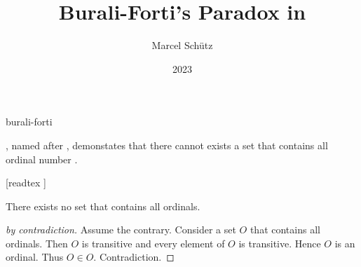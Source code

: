 \documentclass{stex}
\begin{document}
\title{Burali-Forti's Paradox in \Naproche}
\author{Marcel Schütz}
\date{2023}
\maketitle
\begin{smodule}{burali-forti}
\begin{sparagraph}
  \emph{}, named after , demonstates that there cannot exists a set that contains all ordinal number \cite{BuraliForti1897}.
\end{sparagraph}

\begin{forthel}
  [readtex ]

  \begin{theorem*}\label{burali_forti_paradox}
    There exists no set that contains all ordinals.
  \end{theorem*}
  \begin{proof}[ by contradiction]
    Assume the contrary.
    Consider a set $O$ that contains all ordinals.
    Then $O$ is transitive and every element of $O$ is transitive.
    Hence $O$ is an ordinal.
    Thus $O \in O$.
    Contradiction.
  \end{proof}
\end{forthel}
\end{smodule}
\printbibliography
\end{document}
